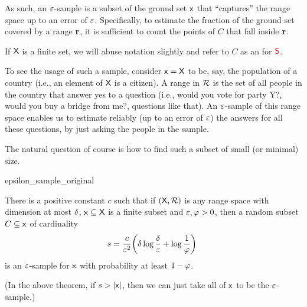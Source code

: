 As such, an ${\varepsilon}$-sample is a subset of the ground set $\mathsf{x}$
that ``captures'' the range space up to an error of
${\varepsilon}$. Specifically, to estimate the fraction of the ground set
covered by a range $\mathbf{r}$, it is sufficient to count the points of
$C$ that fall inside $\mathbf{r}$.

If $\textsf{X}$ is a finite set, we will abuse notation slightly and
refer to $C$ as an 
for ${\textcolor{red}{\mathsf{S}}}$.

To see the usage of such a sample, consider $\mathsf{x} = \textsf{X}$
to be, say, the population of a country (i.e., an element of
$\textsf{X}$ is a citizen). A range in ${\mathcal{R}}$ is the set of all
people in the country that answer yes to a question (i.e., would you
vote for party Y?, would you buy a bridge from me?, questions like
that). An ${\varepsilon}$-sample of this range space enables us to estimate
reliably (up to an error of ${\varepsilon}$) the answers for all these
questions, by just asking the people in the sample.

The natural question of course is how to find such a subset of small
(or minimal) size.

\begin{fragment}{epsilon_sample_original}
    \begin{theorem}
        There is a positive co\-nstant 
        $c$ such that if
        $(\textsf{X},{\mathcal{R}})$ is any range space with \VC dimension
        at most $\delta$, $\mathsf{x} \subseteq \textsf{X}$ is a finite
        subset and ${\varepsilon}, \varphi > 0$, then a random subset
        $C\subseteq \mathsf{x}$ of cardinality
        \begin{align*}
          s = \frac{c}{\eps^2} \pth{ \Dim \log \frac{\Dim}{\eps} +
          \log\frac{1}{\BadProb}}\
        \end{align*}
        is an ${\varepsilon}$-sample for $\mathsf{x}$ with probability at
        least $1-\varphi$.                
    \end{theorem}
\end{fragment}

(In the above theorem, if $s > \left| {\mathsf{x}} \right|$, then we can just
take all of $\mathsf{x}$ to be the ${\varepsilon}$-sample.)

